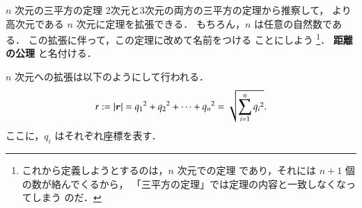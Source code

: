                 \begin{memo}{$n$ 次元の三平方の定理}
                    2次元と3次元の両方の三平方の定理から推察して，
                    より高次元である $n$ 次元に定理を拡張できる．
                    もちろん，$n$ は任意の自然数である．
                    この拡張に伴って，この定理に改めて名前をつける
                    ことにしよう
                        \footnote{
                            これから定義しようとするのは，$n$ 次元での定理
                            であり，それには $n+1$ 個の数が絡んでくるから，
                            「三平方の定理」では定理の内容と一致しなくなってしまう
                            のだ．
                        }．
                    \textbf{距離の公理} と名付ける．

                    $n$ 次元への拡張は以下のようにして行われる．
                    \begin{align}
                        r := |\boldsymbol{r}|
                           = {q_{1}}^{2} + {q_{2}}^{2} + \cdots + {q_{n}}^{2}
                           = \sqrt{\sum_{i=1}^{n} {q_{i}}^{2}}.
                    \end{align}
                    ここに，$q_{i}$ はそれぞれ座標を表す．
                \end{memo}

